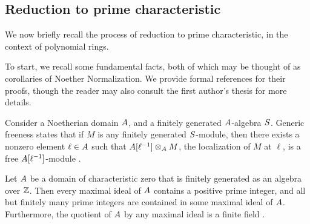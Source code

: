 \documentclass{amsart}
\begin{document}
 
\subsection{Reduction to prime characteristic}

We now briefly recall the process of reduction to prime characteristic, in the context of polynomial rings.

To start, we recall some fundamental facts, both of which may be thought of as corollaries of Noether Normalization.  We provide formal references for their proofs, though the reader may also consult the first author's thesis \cite[Chapter~3]{hernandez.thesis} for more details.

\begin{remark}\label{generic-freeness}
   Consider a Noetherian domain $A$, and a finitely generated $A$-algebra $S$.
   Generic freeness states that if $M$ is any finitely generated $S$-module, then there exists a nonzero element  $\ell \in A$ such that $A[\ell^{-1}] \otimes_A M$, the localization of $M$ at $\ell$, is a free $A[\ell^{-1}]$-module \cite[Theorem~24.1]{matsumura}.
\end{remark}

\begin{remark}
   \label{maximal ideals: R}
   Let $A$ be a domain of characteristic zero that is finitely generated as an algebra over $\mathbb{Z}$.
   Then every maximal ideal of $A$ contains a positive prime integer,
      
    and all but finitely many prime integers are contained in some maximal ideal of $A$.
   Furthermore, the quotient of $A$ by any maximal ideal is a finite field \cite[V.3.4, Corollary~1]{bourbaki.commalg}.
\end{remark}
\end{document}
